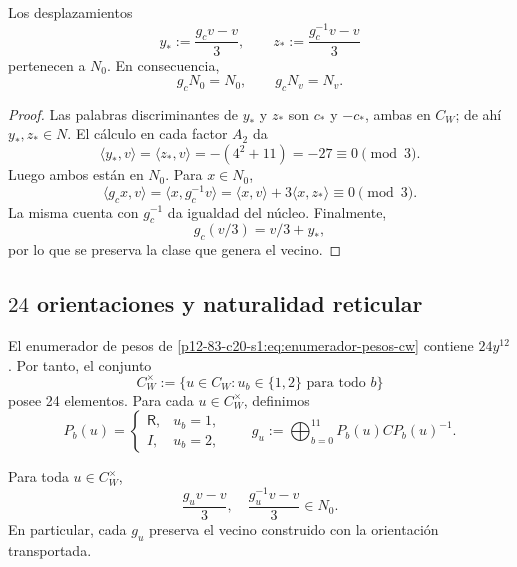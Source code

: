 \begin{theorem}
\label{p12-83-c20-s8:thm:preservacion-vecino-orden-tres-u031}
Los desplazamientos
\begin{equation}
 y_*:=\frac{g_cv-v}{3},
 \qquad
 z_*:=\frac{g_c^{-1}v-v}{3}
 \label{p12-83-c20-s8:eq:desplazamientos-vecino-u031}
\end{equation}
pertenecen a \(N_0\). En consecuencia,
\[
 g_cN_0=N_0,
 \qquad
 g_cN_v=N_v.
\]
\end{theorem}

\begin{proof}
Las palabras discriminantes de \(y_*\) y \(z_*\) son \(c_*\) y
\(-c_*\), ambas en \(C_W\); de ahí \(y_*,z_*\in N\). El cálculo en cada
factor \(A_2\) da
\begin{equation}
 \langle y_*,v\rangle
 =\langle z_*,v\rangle
 =-(4^2+11)=-27\equiv0\pmod3.
 \label{p12-83-c20-s8:eq:emparejamientos-desplazamientos-u031}
\end{equation}
Luego ambos están en \(N_0\). Para \(x\in N_0\),
\[
 \langle g_cx,v\rangle
 =\langle x,g_c^{-1}v\rangle
 =\langle x,v\rangle+3\langle x,z_*\rangle
 \equiv0\pmod3.
\]
La misma cuenta con \(g_c^{-1}\) da igualdad del núcleo. Finalmente,
\[
 g_c(v/3)=v/3+y_*,
\]
por lo que se preserva la clase que genera el vecino.
\end{proof}

\subsection{\(24\) orientaciones y naturalidad reticular}

El enumerador de pesos de \eqref{p12-83-c20-s1:eq:enumerador-pesos-cw} contiene
\(24y^{12}\). Por tanto, el conjunto
\[
 C_W^\times:=
 \{u\in C_W:u_b\in\{1,2\}\text{ para todo }b\}
\]
posee 24 elementos. Para cada \(u\in C_W^\times\), definimos
\[
 P_b(u)=
 \begin{cases}
  \mathsf R,&u_b=1,\\
  I,&u_b=2,
 \end{cases}
 \qquad
 g_u:=\bigoplus_{b=0}^{11}P_b(u)CP_b(u)^{-1}.
\]

\begin{proposition}
\label{p12-83-c20-s8:prop:robustez-orientaciones-u031}
Para toda \(u\in C_W^\times\),
\[
 \frac{g_uv-v}{3},
 \quad
 \frac{g_u^{-1}v-v}{3}
 \in N_0.
\]
En particular, cada \(g_u\) preserva el vecino construido con la
orientación transportada.
\end{proposition}

